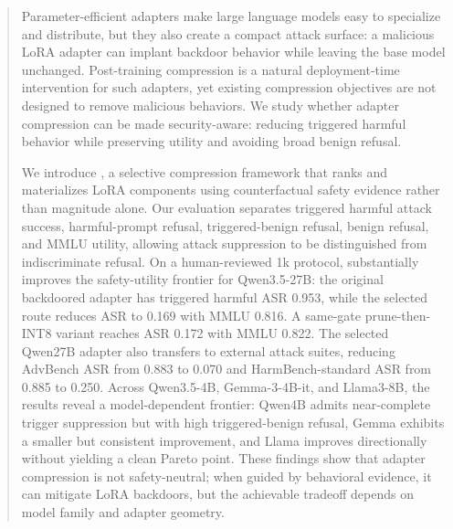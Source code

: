 \begin{abstract}
Parameter-efficient adapters make large language models easy to specialize and distribute, but they also create a compact attack surface: a malicious LoRA adapter can implant backdoor behavior while leaving the base model unchanged.
Post-training compression is a natural deployment-time intervention for such adapters, yet existing compression objectives are not designed to remove malicious behaviors.
We study whether adapter compression can be made security-aware: reducing triggered harmful behavior while preserving utility and avoiding broad benign refusal.

We introduce \sac{}, a selective compression framework that ranks and materializes LoRA components using counterfactual safety evidence rather than magnitude alone.
Our evaluation separates triggered harmful attack success, harmful-prompt refusal, triggered-benign refusal, benign refusal, and MMLU utility, allowing attack suppression to be distinguished from indiscriminate refusal.
On a human-reviewed 1k protocol, \sac{} substantially improves the safety-utility frontier for Qwen3.5-27B: the original backdoored adapter has triggered harmful ASR 0.953, while the selected  route reduces ASR to 0.169 with MMLU 0.816.
A same-gate prune-then-INT8 variant reaches ASR 0.172 with MMLU 0.822.
The selected Qwen27B adapter also transfers to external attack suites, reducing AdvBench ASR from 0.883 to 0.070 and HarmBench-standard ASR from 0.885 to 0.250.
Across Qwen3.5-4B, Gemma-3-4B-it, and Llama3-8B, the results reveal a model-dependent frontier: Qwen4B admits near-complete trigger suppression but with high triggered-benign refusal, Gemma exhibits a smaller but consistent improvement, and Llama improves directionally without yielding a clean Pareto point.
These findings show that adapter compression is not safety-neutral; when guided by behavioral evidence, it can mitigate LoRA backdoors, but the achievable tradeoff depends on model family and adapter geometry.
\end{abstract}
